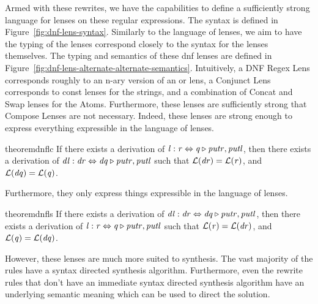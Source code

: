 

Armed with these rewrites, we have the capabilities to define a sufficiently
strong language for lenses on these regular expressions.
The syntax is defined in Figure~\ref{fig:dnf-lens-syntax}.
Similarly to the language of lenses, we aim to have the typing of the lenses
correspond closely to the syntax for the lenses themselves.
The typing and semantics of these dnf lenses are defined in Figure~\ref{fig:dnf-lens-alternate-alternate-semantics}.
Intuitively, a DNF Regex Lens corresponds roughly to an n-ary version of an or lens,
a Conjunct Lens corresponds to const lenses for the strings, and a combination of
Concat and Swap lenses for the Atoms.
Furthermore, these lenses are sufficiently strong that Compose Lenses are not
necessary.
Indeed, these lenses are strong enough to express everything expressible in the language of lenses.
\begin{restatable}{theorem}{dnflc}
\label{thm:completeness-dnf-lenses}
If there exists a derivation of $\mathit{l} : \mathit{r} \Leftrightarrow \mathit{q} \triangleright \mathit{putr},\mathit{putl}$,
then there exists a derivation of $\mathit{dl} : \mathit{dr} \Leftrightarrow \mathit{dq} \triangleright \mathit{putr},\mathit{putl}$ such that
$\mathcal{L}{}(\mathit{dr})=\mathcal{L}{}(\mathit{r})$, and
$\mathcal{L}{}(\mathit{dq})=\mathcal{L}{}(\mathit{q})$.
\end{restatable}
Furthermore, they only express things expressible in the language of lenses.
\begin{restatable}{theorem}{dnfls}
\label{thm:soundness-dnf-lenses}
If there exists a derivation of $\mathit{dl} : \mathit{dr} \Leftrightarrow \mathit{dq} \triangleright \mathit{putr},\mathit{putl}$,
then there exists a derivation of $\mathit{l} : \mathit{r} \Leftrightarrow \mathit{q} \triangleright \mathit{putr},\mathit{putl}$ such that
$\mathcal{L}{}(\mathit{r})=\mathcal{L}{}(\mathit{dr})$, and
$\mathcal{L}{}(\mathit{q})=\mathcal{L}{}(\mathit{dq})$.
\end{restatable}

However, these lenses are much more suited to synthesis.
The vast majority of the rules have a syntax directed synthesis algorithm.
Furthermore, even the rewrite rules that don't have an immediate syntax directed
synthesis algorithm have an underlying semantic meaning which can be used
to direct the solution.
